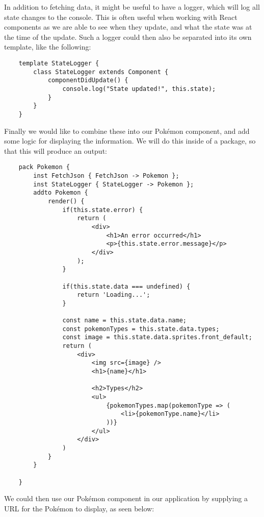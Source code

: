 In addition to fetching data, it might be useful to have a logger, which will log all state changes to the console.
This is often useful when working with React components as we are able to see when they update, and what the state was at the time of the update.
Such a logger could then also be separated into its own template, like the following:

\begin{verbatim}
    template StateLogger {
        class StateLogger extends Component {
            componentDidUpdate() {
                console.log("State updated!", this.state);
            }
        }
    }
\end{verbatim}

Finally we would like to combine these into our Pokémon component, and add some logic for displaying the information.
We will do this inside of a package, so that this will produce an output:

\begin{verbatim}
    pack Pokemon {
        inst FetchJson { FetchJson -> Pokemon };
        inst StateLogger { StateLogger -> Pokemon };
        addto Pokemon {
            render() {
                if(this.state.error) {
                    return (
                        <div>
                            <h1>An error occurred</h1>
                            <p>{this.state.error.message}</p>
                        </div>
                    );
                }

                if(this.state.data === undefined) {
                    return 'Loading...';
                }

                const name = this.state.data.name;
                const pokemonTypes = this.state.data.types;
                const image = this.state.data.sprites.front_default;
                return (
                    <div>
                        <img src={image} />
                        <h1>{name}</h1>

                        <h2>Types</h2>
                        <ul>
                            {pokemonTypes.map(pokemonType => (
                                <li>{pokemonType.name}</li>
                            ))}
                        </ul>
                    </div>
                )
            }
        }

    }
\end{verbatim}

We could then use our Pokémon component in our application by supplying a URL for the Pokémon to display, as seen below:

